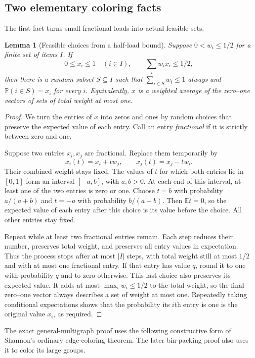 \documentclass[11pt]{article}
\newtheorem{lemma}[theorem]{Lemma}
\theoremstyle{definition}\newtheorem{algorithm}{Algorithm}[section]
\numberwithin{equation}{section}
\theoremstyle{remark}\newtheorem*{remark}{Remark}
\newcommand{\E}{\mathbb E}
\newcommand{\Prb}{\mathbb P}
\begin{document}
\subsection{Two elementary coloring facts}
The first fact turns small fractional loads into actual feasible sets.

\begin{lemma}[Feasible choices from a half-load bound]\label{lem:half-load}
Suppose $0<w_i\le1/2$ for a finite set of items $I$. If
\[
 0\le x_i\le1\quad(i\in I),\qquad \sum_iw_ix_i\le1/2,
\]
then there is a random subset $S\subseteq I$ such that
$\sum_{i\in S}w_i\le1$ always and $\Prb(i\in S)=x_i$ for every $i$.
Equivalently, $x$ is a weighted average of the zero--one vectors of sets
of total weight at most one.
\end{lemma}
\begin{proof}
We turn the entries of $x$ into zeros and ones by random choices that
preserve the expected value of each entry. Call an entry \emph{fractional}
if it is strictly between zero and one.

Suppose two entries $x_i,x_j$ are fractional. Replace them temporarily by
\[
 x_i(t)=x_i+t w_j,\qquad x_j(t)=x_j-t w_i.
\]
Their combined weight stays fixed. The values of $t$ for which both
entries lie in $[0,1]$ form an interval $[-a,b]$, with $a,b>0$. At each
end of this interval, at least one of the two entries is zero or one.
Choose $t=b$ with probability $a/(a+b)$ and $t=-a$ with probability
$b/(a+b)$. Then $\E t=0$, so the expected value of each entry after this
choice is its value before the choice. All other entries stay fixed.

Repeat while at least two fractional entries remain. Each step reduces their
number, preserves total weight, and preserves all entry values in
expectation. Thus the process stops after at most $|I|$ steps, with total
weight still at most $1/2$ and with at most one fractional entry. If that
entry has value $q$, round it to one with probability $q$ and to zero
otherwise. This last choice also preserves its expected value. It adds
at most $\max_i w_i\le1/2$ to the total weight, so the final zero--one
vector always describes a set of weight at most one. Repeatedly taking
conditional expectations shows that the probability its $i$th entry is
one is the original value $x_i$, as required.
\end{proof}


The exact general-multigraph proof uses the following constructive form
of Shannon's ordinary edge-coloring theorem.  The later bin-packing proof
also uses it to color its large groups.
\end{document}
